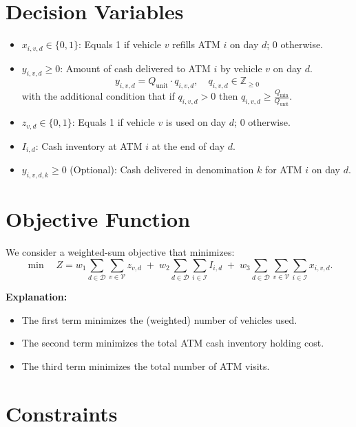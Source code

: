 \documentclass[11pt]{article}
\begin{document}
\section{Decision Variables}
\begin{itemize}[leftmargin=1.5cm]
    \item \(\displaystyle x_{i,v,d} \in \{0,1\}\): Equals 1 if vehicle \(v\) refills ATM \(i\) on day \(d\); 0 otherwise.
    \item \(\displaystyle y_{i,v,d} \ge 0\): Amount of cash delivered to ATM \(i\) by vehicle \(v\) on day \(d\).  
    \[
    y_{i,v,d} = Q_{\text{unit}} \cdot q_{i,v,d}, \quad q_{i,v,d} \in \mathbb{Z}_{\geq 0}
    \]
    with the additional condition that if \(q_{i,v,d} > 0\) then \(q_{i,v,d} \ge \frac{Q_{\min}}{Q_{\text{unit}}}\).
    \item \(\displaystyle z_{v,d} \in \{0,1\}\): Equals 1 if vehicle \(v\) is used on day \(d\); 0 otherwise.
    \item \(\displaystyle I_{i,d}\): Cash inventory at ATM \(i\) at the end of day \(d\).
    \item \(\displaystyle y_{i,v,d,k} \ge 0\) (Optional): Cash delivered in denomination \(k\) for ATM \(i\) on day \(d\).
\end{itemize}

\section{Objective Function}
We consider a weighted-sum objective that minimizes:
\begin{equation*}
    \min \quad Z = w_1 \sum_{d \in \mathcal{D}} \sum_{v \in \mathcal{V}} z_{v,d} \;+\; w_2 \sum_{d \in \mathcal{D}} \sum_{i \in \mathcal{I}} I_{i,d} \;+\; w_3 \sum_{d \in \mathcal{D}} \sum_{v \in \mathcal{V}} \sum_{i \in \mathcal{I}} x_{i,v,d}.
\end{equation*}

\noindent \textbf{Explanation:}
\begin{itemize}[leftmargin=1cm]
    \item The first term minimizes the (weighted) number of vehicles used.
    \item The second term minimizes the total ATM cash inventory holding cost.
    \item The third term minimizes the total number of ATM visits.
\end{itemize}

\section{Constraints}
\end{document}
